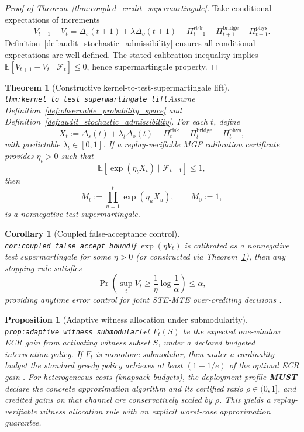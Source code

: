 \documentclass[11pt]{article}
\theoremstyle{definition}
\theoremstyle{plain}
\newtheorem{proposition}{Proposition}
\newtheorem{theorem}{Theorem}
\newtheorem{corollary}{Corollary}
\newcommand{\MUST}{\textbf{MUST}}
\newcommand{\STE}{\textsf{STE}}
\newcommand{\MTE}{\textsf{MTE}}
\newcommand{\lbl}[1]{\texttt{\footnotesize\nolinkurl{#1}}}
\newcommand{\DefLabel}[1]{\hfill{\small\lbl{#1}}}
\newcommand{\Expect}{\mathbb{E}}
\newcommand{\deltas}{\Delta_s}
\newcommand{\deltao}{\Delta_o}
\newcommand{\PiRisk}{\Pi^{\mathrm{risk}}}
\newcommand{\PiBridge}{\Pi^{\mathrm{bridge}}}
\newcommand{\PiPhys}{\Pi^{\mathrm{phys}}}
\newcommand{\Vcouple}{V}
\begin{document}
\begin{proof}[Proof of Theorem~\ref{thm:coupled_credit_supermartingale}]
Take conditional expectations of increments
\[
\Vcouple_{t+1}-\Vcouple_t
=
\deltas(t+1)+\lambda\deltao(t+1)-\PiRisk_{t+1}-\PiBridge_{t+1}-\PiPhys_{t+1}.
\]
Definition~\ref{def:audit_stochastic_admissibility} ensures all conditional expectations are well-defined. The stated calibration inequality implies
$\mathbb{E}[\Vcouple_{t+1}-\Vcouple_t\mid\mathcal{F}_t]\le 0$, hence supermartingale property.
\end{proof}

\begin{theorem}[Constructive kernel-to-test-supermartingale lift]\DefLabel{thm:kernel_to_test_supermartingale_lift}\label{thm:kernel_to_test_supermartingale_lift}
Assume Definition~\ref{def:observable_probability_space} and Definition~\ref{def:audit_stochastic_admissibility}.
For each $t$, define
\[
X_t:=\deltas(t)+\lambda_t\deltao(t)-\PiRisk_t-\PiBridge_t-\PiPhys_t,
\]
with predictable $\lambda_t\in[0,1]$.
If a replay-verifiable MGF calibration certificate provides $\eta_t>0$ such that
\[
\Expect[\exp(\eta_t X_t)\mid\mathcal{F}_{t-1}] \le 1,
\]
then
\[
M_t:=\prod_{u=1}^{t}\exp(\eta_u X_u),\qquad M_0:=1,
\]
is a nonnegative test supermartingale.
\end{theorem}

\begin{corollary}[Coupled false-acceptance control]\DefLabel{cor:coupled_false_accept_bound}\label{cor:coupled_false_accept_bound}
If $\exp(\eta\Vcouple_t)$ is calibrated as a nonnegative test supermartingale for some $\eta>0$ (or constructed via Theorem~\ref{thm:kernel_to_test_supermartingale_lift}), then any stopping rule satisfies
\[
\Pr\!\left(\sup_t \Vcouple_t \ge \frac{1}{\eta}\log\frac{1}{\alpha}\right)\le \alpha,
\]
providing anytime error control for joint \STE{}-\MTE{} over-crediting decisions \cite{HowardEtAl2020}.
\end{corollary}

\begin{proposition}[Adaptive witness allocation under submodularity]\DefLabel{prop:adaptive_witness_submodular}\label{prop:adaptive_witness_submodular}
Let $F_t(S)$ be the expected one-window ECR gain from activating witness subset $S$, under a declared budgeted intervention policy.
If $F_t$ is monotone submodular, then under a cardinality budget the standard greedy policy achieves at least $(1-1/e)$ of the optimal ECR gain \cite{NemhauserWolseyFisher1978}.
For heterogeneous costs (knapsack budgets), the deployment profile \MUST{} declare the concrete approximation algorithm and its certified ratio $\rho\in(0,1]$, and credited gains on that channel are conservatively scaled by $\rho$.
This yields a replay-verifiable witness allocation rule with an explicit worst-case approximation guarantee.
\end{proposition}
\end{document}
